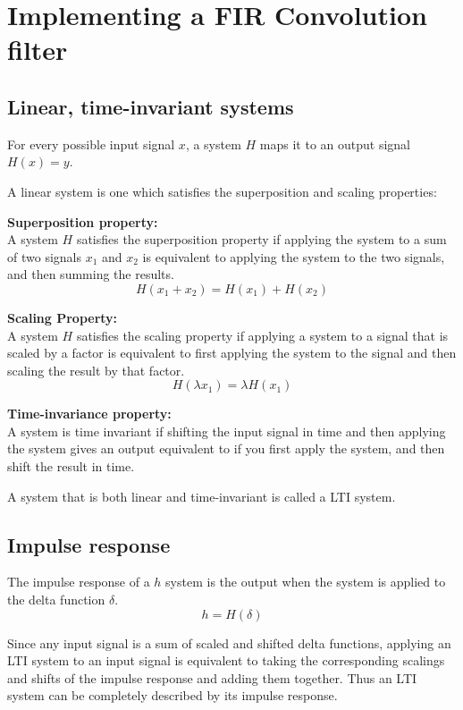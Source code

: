 \section{Implementing a FIR Convolution filter}

\subsection{Linear, time-invariant systems}
For every possible input signal $x$, a system $H$ maps it to an output signal $H(x) = y$.

\begin{center}\end{center}
A linear system is one which satisfies the superposition and scaling properties:

\textbf{Superposition property:}\\
A system $H$ satisfies the superposition property if applying the system to a sum
of two signals $x_1$ and $x_2$ is equivalent to applying the system to the two signals,
and then summing the results.
$$H(x_1 + x_2) = H(x_1) + H(x_2)$$

\textbf{Scaling Property:}\\
A system $H$ satisfies the scaling property if applying a system to a signal that is scaled by a factor
is equivalent to first applying the system to the signal and then scaling the result by that factor.
$$H(\lambda x_1) = \lambda H(x_1)$$


\textbf{Time-invariance property:}\\
A system is time invariant if shifting the input signal in time and then
applying the system gives an output equivalent to if you first apply the system, 
and then shift the result in time.

\begin{center}\end{center}

A system that is both linear and time-invariant is called a LTI system.

\pagebreak 

\subsection{Impulse response}
The impulse response of a $h$ system is the output when the system is applied to the delta function $\delta$.
$$h = H(\delta)$$

\begin{center}\end{center}
Since any input signal is a sum of scaled and shifted delta functions, applying an 
LTI system to an input signal is equivalent to taking the corresponding scalings and 
shifts of the impulse response and adding them together. 
Thus an LTI system can be completely described by its impulse response.

